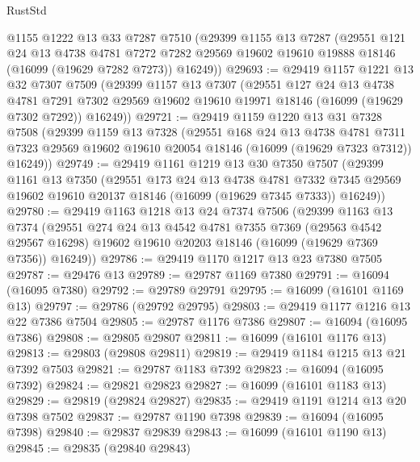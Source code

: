 \begin{lexlean}{RustStd}
\begin{coremodule}
    @1155
    @1222
    @13
    @33
    @7287
    @7510
    (@29399
      @1155
      @13
      @7287
      (@29551
        @121
        @24
        @13
        @4738
        @4781
        @7272
        @7282
        @29569
        @19602
        @19610
        @19888
        @18146
        (@16099 (@19629 @7282 @7273))
        @16249))
@29693 := @29419
    @1157
    @1221
    @13
    @32
    @7307
    @7509
    (@29399
      @1157
      @13
      @7307
      (@29551
        @127
        @24
        @13
        @4738
        @4781
        @7291
        @7302
        @29569
        @19602
        @19610
        @19971
        @18146
        (@16099 (@19629 @7302 @7292))
        @16249))
@29721 := @29419
    @1159
    @1220
    @13
    @31
    @7328
    @7508
    (@29399
      @1159
      @13
      @7328
      (@29551
        @168
        @24
        @13
        @4738
        @4781
        @7311
        @7323
        @29569
        @19602
        @19610
        @20054
        @18146
        (@16099 (@19629 @7323 @7312))
        @16249))
@29749 := @29419
    @1161
    @1219
    @13
    @30
    @7350
    @7507
    (@29399
      @1161
      @13
      @7350
      (@29551
        @173
        @24
        @13
        @4738
        @4781
        @7332
        @7345
        @29569
        @19602
        @19610
        @20137
        @18146
        (@16099 (@19629 @7345 @7333))
        @16249))
@29780 := @29419
    @1163
    @1218
    @13
    @24
    @7374
    @7506
    (@29399
      @1163
      @13
      @7374
      (@29551
        @274
        @24
        @13
        @4542
        @4781
        @7355
        @7369
        (@29563 @4542 @29567 @16298)
        @19602
        @19610
        @20203
        @18146
        (@16099 (@19629 @7369 @7356))
        @16249))
@29786 := @29419 @1170 @1217 @13 @23 @7380 @7505
@29787 := @29476 @13
@29789 := @29787 @1169 @7380
@29791 := @16094 (@16095 @7380)
@29792 := @29789 @29791
@29795 := @16099 (@16101 @1169 @13)
@29797 := @29786 (@29792 @29795)
@29803 := @29419 @1177 @1216 @13 @22 @7386 @7504
@29805 := @29787 @1176 @7386
@29807 := @16094 (@16095 @7386)
@29808 := @29805 @29807
@29811 := @16099 (@16101 @1176 @13)
@29813 := @29803 (@29808 @29811)
@29819 := @29419 @1184 @1215 @13 @21 @7392 @7503
@29821 := @29787 @1183 @7392
@29823 := @16094 (@16095 @7392)
@29824 := @29821 @29823
@29827 := @16099 (@16101 @1183 @13)
@29829 := @29819 (@29824 @29827)
@29835 := @29419 @1191 @1214 @13 @20 @7398 @7502
@29837 := @29787 @1190 @7398
@29839 := @16094 (@16095 @7398)
@29840 := @29837 @29839
@29843 := @16099 (@16101 @1190 @13)
@29845 := @29835 (@29840 @29843)

\end{coremodule}
\end{lexlean}
